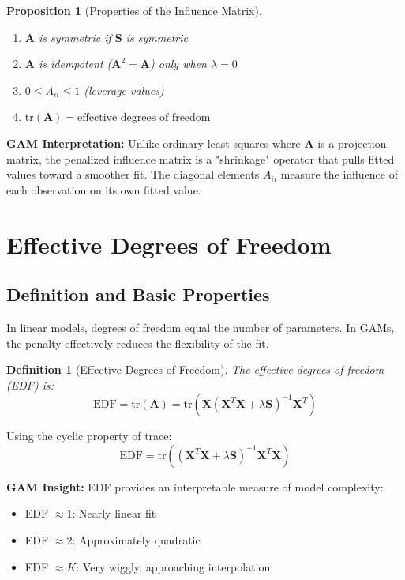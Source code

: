 \documentclass[12pt]{article}
\newtheorem{proposition}[theorem]{Proposition}
\newtheorem{definition}{Definition}
\newcommand{\tr}{\text{tr}}
\begin{document}
\begin{proposition}[Properties of the Influence Matrix]
\begin{enumerate}
    \item $\mathbf{A}$ is symmetric if $\mathbf{S}$ is symmetric
    \item $\mathbf{A}$ is idempotent ($\mathbf{A}^2 = \mathbf{A}$) only when $\lambda = 0$
    \item $0 \leq A_{ii} \leq 1$ (leverage values)
    \item $\tr(\mathbf{A}) = \text{effective degrees of freedom}$
\end{enumerate}
\end{proposition}

\textbf{GAM Interpretation:} Unlike ordinary least squares where $\mathbf{A}$ is a projection matrix, the penalized influence matrix is a "shrinkage" operator that pulls fitted values toward a smoother fit. The diagonal elements $A_{ii}$ measure the influence of each observation on its own fitted value.

\section{Effective Degrees of Freedom}

\subsection{Definition and Basic Properties}

In linear models, degrees of freedom equal the number of parameters. In GAMs, the penalty effectively reduces the flexibility of the fit.

\begin{definition}[Effective Degrees of Freedom]
The effective degrees of freedom (EDF) is:
\begin{equation}
\text{EDF} = \tr(\mathbf{A}) = \tr\left(\mathbf{X}(\mathbf{X}^T\mathbf{X} + \lambda\mathbf{S})^{-1}\mathbf{X}^T\right)
\end{equation}
\end{definition}

Using the cyclic property of trace:
\begin{equation}
\text{EDF} = \tr\left((\mathbf{X}^T\mathbf{X} + \lambda\mathbf{S})^{-1}\mathbf{X}^T\mathbf{X}\right)
\end{equation}

\textbf{GAM Insight:} EDF provides an interpretable measure of model complexity:
\begin{itemize}
    \item EDF $\approx 1$: Nearly linear fit
    \item EDF $\approx 2$: Approximately quadratic
    \item EDF $\approx K$: Very wiggly, approaching interpolation
\end{itemize}
\end{document}
